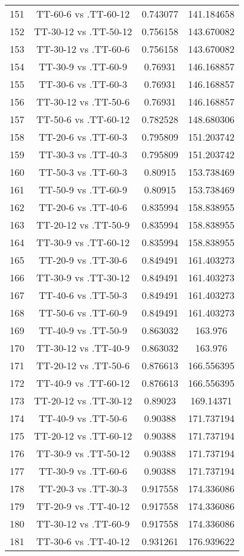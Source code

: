 \documentclass[a4paper,10pt]{article}
\begin{document}
\begin{landscape}
\begin{table}[!htp]
\begin{tabular}{cccc}
151&TT-60-6 vs .TT-60-12&0.743077&141.184658\\
152&TT-30-12 vs .TT-50-12&0.756158&143.670082\\
153&TT-30-12 vs .TT-60-6&0.756158&143.670082\\
154&TT-30-9 vs .TT-60-9&0.76931&146.168857\\
155&TT-30-6 vs .TT-60-3&0.76931&146.168857\\
156&TT-30-12 vs .TT-50-6&0.76931&146.168857\\
157&TT-50-6 vs .TT-60-12&0.782528&148.680306\\
158&TT-20-6 vs .TT-60-3&0.795809&151.203742\\
159&TT-30-3 vs .TT-40-3&0.795809&151.203742\\
160&TT-50-3 vs .TT-60-3&0.80915&153.738469\\
161&TT-50-9 vs .TT-60-9&0.80915&153.738469\\
162&TT-20-6 vs .TT-40-6&0.835994&158.838955\\
163&TT-20-12 vs .TT-50-9&0.835994&158.838955\\
164&TT-30-9 vs .TT-60-12&0.835994&158.838955\\
165&TT-20-9 vs .TT-30-6&0.849491&161.403273\\
166&TT-30-9 vs .TT-30-12&0.849491&161.403273\\
167&TT-40-6 vs .TT-50-3&0.849491&161.403273\\
168&TT-50-6 vs .TT-60-9&0.849491&161.403273\\
169&TT-40-9 vs .TT-50-9&0.863032&163.976\\
170&TT-30-12 vs .TT-40-9&0.863032&163.976\\
171&TT-20-12 vs .TT-50-6&0.876613&166.556395\\
172&TT-40-9 vs .TT-60-12&0.876613&166.556395\\
173&TT-20-12 vs .TT-30-12&0.89023&169.14371\\
174&TT-40-9 vs .TT-50-6&0.90388&171.737194\\
175&TT-20-12 vs .TT-60-12&0.90388&171.737194\\
176&TT-30-9 vs .TT-50-12&0.90388&171.737194\\
177&TT-30-9 vs .TT-60-6&0.90388&171.737194\\
178&TT-20-3 vs .TT-30-3&0.917558&174.336086\\
179&TT-20-9 vs .TT-40-12&0.917558&174.336086\\
180&TT-30-12 vs .TT-60-9&0.917558&174.336086\\
181&TT-30-6 vs .TT-40-12&0.931261&176.939622\\

\end{tabular}
\end{table}
\end{landscape}
\end{document}
